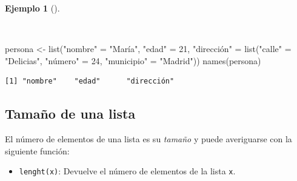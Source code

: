\documentclass[
  spanish,
  a4paper,
]{scrreport}
\newenvironment{Shaded}{\begin{snugshade}}{\end{snugshade}}
\newcommand{\DecValTok}[1]{\textcolor[rgb]{0.68,0.00,0.00}{#1}}
\newcommand{\FunctionTok}[1]{\textcolor[rgb]{0.28,0.35,0.67}{#1}}
\newcommand{\NormalTok}[1]{\textcolor[rgb]{0.00,0.23,0.31}{#1}}
\newcommand{\OtherTok}[1]{\textcolor[rgb]{0.00,0.23,0.31}{#1}}
\newcommand{\StringTok}[1]{\textcolor[rgb]{0.13,0.47,0.30}{#1}}
\providecommand{\tightlist}{%
  \setlength{\itemsep}{0pt}\setlength{\parskip}{0pt}}
\theoremstyle{definition}
\theoremstyle{definition}
\newtheorem{example}{Ejemplo}[chapter]
\theoremstyle{remark}
\begin{document}
\begin{example}[]\protect\hypertarget{exm-acceso-listas}{}\label{exm-acceso-listas}

~

\begin{Shaded}
\begin{Highlighting}[]
\NormalTok{persona }\OtherTok{\textless{}{-}} \FunctionTok{list}\NormalTok{(}\StringTok{"nombre"} \OtherTok{=} \StringTok{"María"}\NormalTok{, }\StringTok{"edad"} \OtherTok{=} \DecValTok{21}\NormalTok{, }\StringTok{"dirección"} \OtherTok{=} \FunctionTok{list}\NormalTok{(}\StringTok{"calle"} \OtherTok{=} \StringTok{"Delicias"}\NormalTok{, }\StringTok{"número"} \OtherTok{=} \DecValTok{24}\NormalTok{, }\StringTok{"municipio"} \OtherTok{=} \StringTok{"Madrid"}\NormalTok{))}
\FunctionTok{names}\NormalTok{(persona)}
\end{Highlighting}
\end{Shaded}

\begin{verbatim}
[1] "nombre"    "edad"      "dirección"
\end{verbatim}

\end{example}

\subsection{Tamaño de una lista}\label{tamauxf1o-de-una-lista}

El número de elementos de una lista es su \emph{tamaño} y puede
averiguarse con la siguiente función:

\begin{itemize}
\tightlist
\item
  \texttt{lenght(x)}: Devuelve el número de elementos de la lista
  \texttt{x}.
\end{itemize}
\end{document}
